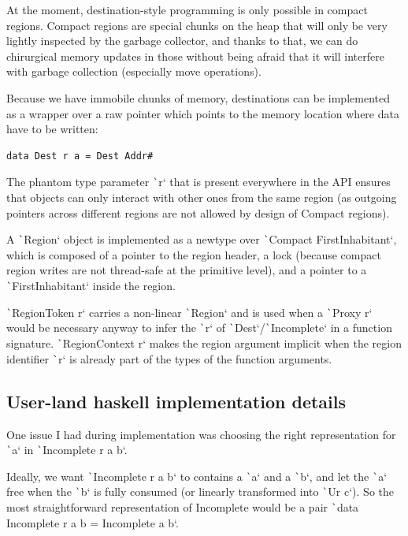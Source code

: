\documentclass[english]{jflart}
\begin{document}
At the moment, destination-style programming is only possible in compact regions. Compact regions are special chunks on the heap that will only be very lightly inspected by the garbage collector, and thanks to that, we can do chirurgical memory updates in those without being afraid that it will interfere with garbage collection (especially move operations).

Because we have immobile chunks of memory, destinations can be implemented as a wrapper over a raw pointer which points to the memory location where data have to be written:

{\small
\begin{verbatim}
data Dest r a = Dest Addr#
\end{verbatim}
}

The phantom type parameter \texttt`r` that is present everywhere in the API ensures that objects can only interact with other ones from the same region (as outgoing pointers across different regions are not allowed by design of Compact regions).

A \texttt`Region` object is implemented as a newtype over \texttt`Compact FirstInhabitant`, which is composed of a pointer to the region header, a lock (because compact region writes are not thread-safe at the primitive level), and a pointer to a \texttt`FirstInhabitant` inside the region.

\texttt`RegionToken r` carries a non-linear \texttt`Region` and is used when a \texttt`Proxy r` would be necessary anyway to infer the \texttt`r` of \texttt`Dest`/\texttt`Incomplete` in a function signature. \texttt`RegionContext r` makes the region argument implicit when the region identifier \texttt`r` is already part of the types of the function arguments.

\subsection{User-land haskell implementation details}
 
One issue I had during implementation was choosing the right representation for \texttt`a` in \texttt`Incomplete r a b`.

Ideally, we want \texttt`Incomplete r a b` to contains a \texttt`a` and a \texttt`b`, and let the \texttt`a` free when the \texttt`b` is fully consumed (or linearly transformed into \texttt`Ur c`). So the most straightforward representation of Incomplete would be a pair \texttt`data Incomplete r a b = Incomplete a b`.
\end{document}
